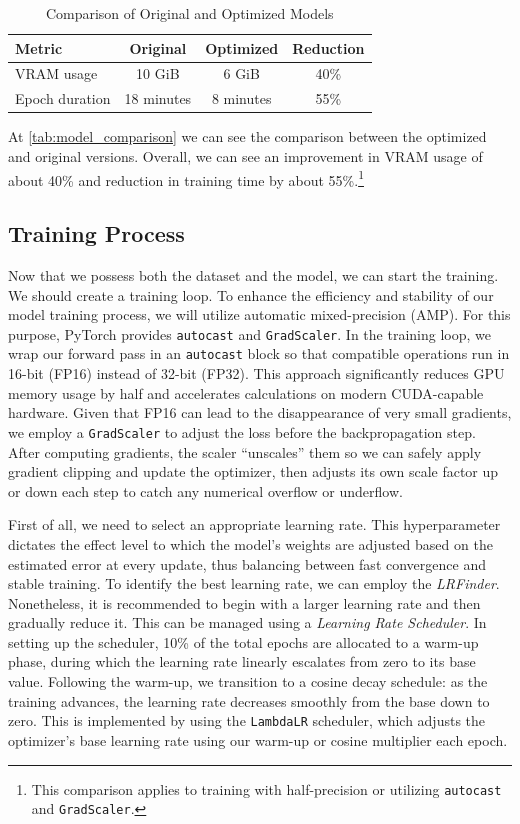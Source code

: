 \begin{table}[hbt]
\centering
\caption{Comparison of Original and Optimized Models}
\label{tab:model_comparison}
\begin{tabular}{|l|c|c|c|}
\hline
Metric & Original & Optimized & Reduction \\ \hline
VRAM usage & 10 GiB & 6 GiB & 40\% \\ \hline
Epoch duration & 18 minutes & 8 minutes & 55\% \\ \hline
\end{tabular}
\end{table}

At \autoref{tab:model_comparison} we can see the comparison between the optimized and original versions. Overall, we can see an improvement in VRAM usage of about 40\% and  reduction in training time by about 55\%.\footnote{This comparison applies to training with half-precision or utilizing \texttt{autocast} and \texttt{GradScaler}.}

\subsection*{Training Process}

Now that we possess both the dataset and the model, we can start the training. We should create a training loop. To enhance the efficiency and stability of our model training process, we will utilize automatic mixed-precision (AMP). For this purpose, PyTorch provides \texttt{autocast} and \texttt{GradScaler}. In the training loop, we wrap our forward pass in an \texttt{autocast} block so that compatible operations run in 16-bit (FP16) instead of 32-bit (FP32). This approach significantly reduces GPU memory usage by half and accelerates calculations on modern CUDA-capable hardware. Given that FP16 can lead to the disappearance of very small gradients, we employ a \texttt{GradScaler} to adjust the loss before the backpropagation step. After computing gradients, the scaler “unscales” them so we can safely apply gradient clipping and update the optimizer, then adjusts its own scale factor up or down each step to catch any numerical overflow or underflow.

First of all, we need to select an appropriate learning rate. This hyperparameter dictates the effect level to which the model's weights are adjusted based on the estimated error at every update, thus balancing between fast convergence and stable training. To identify the best learning rate, we can employ the \textit{LRFinder}. Nonetheless, it is recommended to begin with a larger learning rate and then gradually reduce it. This can be managed using a \textit{Learning Rate Scheduler}. In setting up the scheduler, 10\% of the total epochs are allocated to a warm-up phase, during which the learning rate linearly escalates from zero to its base value. Following the warm-up, we transition to a cosine decay schedule: as the training advances, the learning rate decreases smoothly from the base down to zero. This is implemented by using the \texttt{LambdaLR} scheduler, which adjusts the optimizer’s base learning rate using our warm-up or cosine multiplier each epoch.

